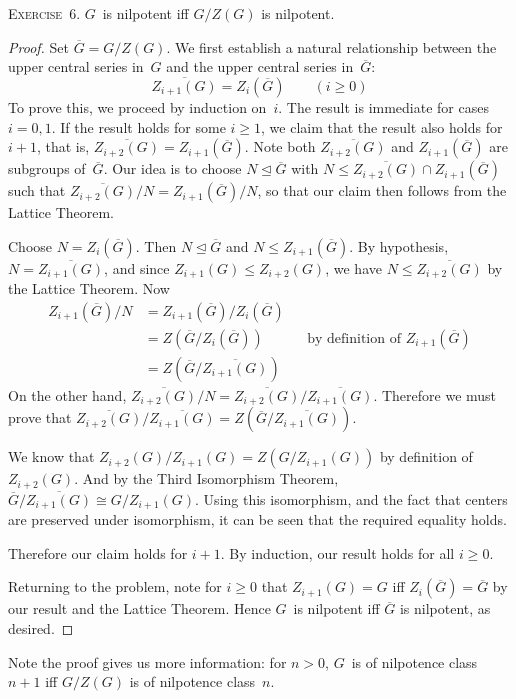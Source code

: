 \documentclass[letterpaper]{article}
\newcommand{\exercise}[1]{\goodbreak\noindent\textsc{Exercise~{#1}.}}
\newcommand{\iso}{\cong}
\newcommand{\sect}{\cap}
\newcommand{\subgroup}{\le}
\newcommand{\normal}{\trianglelefteq}
\newcommand{\res}[1]{\overline{#1}}
\begin{document}
\exercise{6}
$G$~is nilpotent iff $G/Z(G)$ is nilpotent.
\begin{proof}
Set $\res{G}=G/Z(G)$. We first establish a natural relationship between the upper central series in~$G$ and the upper central series in~$\res{G}$:
$$\res{Z_{i+1}(G)}=Z_i(\res{G})\qquad(i\ge0)$$
To prove this, we proceed by induction on~$i$. The result is immediate for cases $i=0,1$. If the result holds for some $i\ge1$, we claim that the result also holds for $i+1$, that is, $\res{Z_{i+2}(G)}=Z_{i+1}(\res{G})$. Note both $\res{Z_{i+2}(G)}$ and $Z_{i+1}(\res{G})$ are subgroups of~$\res{G}$. Our idea is to choose $N\normal\res{G}$ with $N\subgroup{\res{Z_{i+2}(G)}\sect Z_{i+1}(\res{G})}$ such that $\res{Z_{i+2}(G)}/N=Z_{i+1}(\res{G})/N$, so that our claim then follows from the Lattice Theorem.

Choose $N=Z_i(\res{G})$. Then $N\normal\res{G}$ and $N\subgroup Z_{i+1}(\res{G})$. By hypothesis, $N=\res{Z_{i+1}(G)}$, and since $Z_{i+1}(G)\subgroup Z_{i+2}(G)$, we have $N\subgroup\res{Z_{i+2}(G)}$ by the Lattice Theorem. Now
\begin{align*}
Z_{i+1}(\res{G})/N&=Z_{i+1}(\res{G})/Z_i(\res{G})&&\\
	&=Z(\res{G}/Z_i(\res{G}))&&\text{by definition of $Z_{i+1}(\res{G})$}\\
	&=Z(\res{G}/\res{Z_{i+1}(G)})&&
\end{align*}
On the other hand, $\res{Z_{i+2}(G)}/N=\res{Z_{i+2}(G)}/\res{Z_{i+1}(G)}$. Therefore we must prove that $\res{Z_{i+2}(G)}/\res{Z_{i+1}(G)}=Z(\res{G}/\res{Z_{i+1}(G)})$.

We know that $Z_{i+2}(G)/Z_{i+1}(G)=Z(G/Z_{i+1}(G))$ by definition of $Z_{i+2}(G)$. And by the Third Isomorphism Theorem, $\res{G}/\res{Z_{i+1}(G)}\iso G/Z_{i+1}(G)$. Using this isomorphism, and the fact that centers are preserved under isomorphism, it can be seen that the required equality holds.

Therefore our claim holds for $i+1$. By induction, our result holds for all $i\ge0$.

Returning to the problem, note for $i\ge0$ that $Z_{i+1}(G)=G$ iff $Z_i(\res{G})=\res{G}$ by our result and the Lattice Theorem. Hence $G$~is nilpotent iff $\res{G}$ is nilpotent, as desired.
\end{proof}
\noindent Note the proof gives us more information: for $n>0$, $G$~is of nilpotence class $n+1$ iff $G/Z(G)$ is of nilpotence class~$n$.
\end{document}
